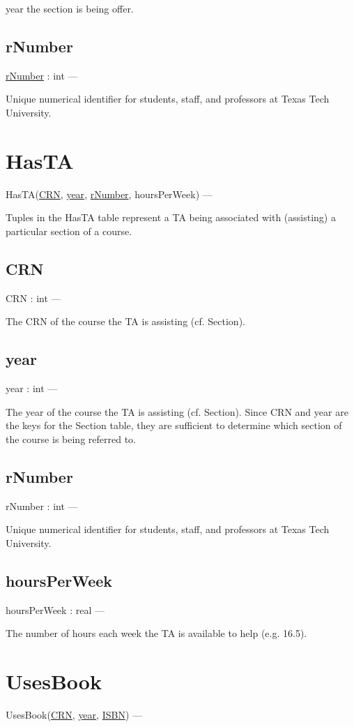 \documentclass[10pt]{article}
\begin{document}
	year the section is being offer.
	
	\subsection{rNumber}
	\underline{rNumber} : int ---
	
	Unique numerical identifier for students, staff, and professors at Texas Tech University.


\section{HasTA}
HasTA(\underline{CRN}, \underline{year}, \underline{rNumber}, hoursPerWeek) ---

Tuples in the HasTA table represent a TA being associated with (assisting) a particular section of a course.
	
	\subsection{CRN}
	CRN : int ---
	
	The CRN of the course the TA is assisting (cf. Section).
	
	\subsection{year}
	year : int ---
	
	The year of the course the TA is assisting (cf. Section). Since CRN and year are the keys for the Section table, they are sufficient to determine which section of the course is being referred to.
	
	\subsection{rNumber}
	rNumber : int ---
	
	Unique numerical identifier for students, staff, and professors at Texas Tech University.
	
	\subsection{hoursPerWeek}
	hoursPerWeek : real ---
	
	The number of hours each week the TA is available to help (e.g. 16.5).


\section{UsesBook}
UsesBook(\underline{CRN}, \underline{year}, \underline{ISBN}) ---
\end{document}
